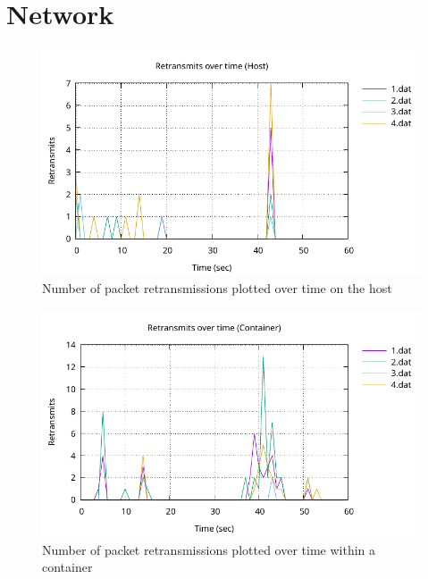 \section{Network}
\label{ch:experiment/network}

\begin{figure}[H]
    \centering
    \includegraphics[width=1\textwidth]{images/results/network-host-retransmits.pdf}
    \caption{Number of packet retransmissions plotted over time on the host}
    \label{ticket-builder-class}
\end{figure}

\begin{figure}[H]
    \centering
    \includegraphics[width=1\textwidth]{images/results/network-retransmits-container.pdf}
    \caption{Number of packet retransmissions plotted over time within a container}
    \label{ticket-builder-class}
\end{figure}

